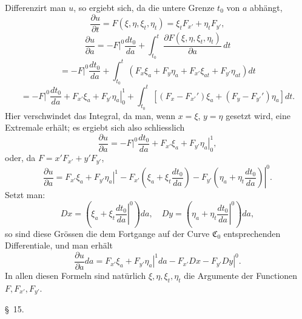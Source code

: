 \documentclass[11pt,a4paper,leqno]{article}
\begin{document}
Differenzirt man $u$, so ergiebt sich, da die untere Grenze $t_0$ von $a$ abhängt,
\[
\frac{\partial u}{\partial t}=F(\xi,\eta,\xi_t,\eta_t)=\xi_tF_{x'}+\eta_tF_{y'},
\]
\begin{equation}\tag{30}
\frac{\partial u}{\partial a}
=-\left.F\right|^0\frac{dt_0}{da}
+\int_{t_0}^{t}\frac{\partial F(\xi,\eta,\xi_t,\eta_t)}{\partial a}\,dt
\end{equation}
\[
=-\left.F\right|^0\frac{dt_0}{da}
+\int_{t_0}^{t}\left(F_x\xi_a+F_y\eta_a+F_{x'}\xi_{at}+F_{y'}\eta_{at}\right)dt
\]
\begin{equation}\tag{30}
=-\left.F\right|^0\frac{dt_0}{da}
+\left.F_{x'}\xi_a+F_{y'}\eta_a\right|_0^1
+\int_{t_0}^{t}\left[(F_x-F_{x'}')\xi_a+(F_y-F_{y'}')\eta_a\right]dt.
\end{equation}
Hier verschwindet das Integral, da man, wenn $x=\xi$, $y=\eta$ gesetzt wird, eine Extremale erhält; es ergiebt sich also schliesslich
\begin{equation}\tag{31}
\frac{\partial u}{\partial a}
=-\left.F\right|^0\frac{dt_0}{da}
+\left.F_{x'}\xi_a+F_{y'}\eta_a\right|_0^1,
\end{equation}
oder, da $F=x'F_{x'}+y'F_{y'}$,
\[
\frac{\partial u}{\partial a}
=\left.F_{x'}\xi_a+F_{y'}\eta_a\right|^1
-\left.F_{x'}\left(\xi_a+\xi_t\frac{dt_0}{da}\right)
-F_{y'}\left(\eta_a+\eta_t\frac{dt_0}{da}\right)\right|^0.
\]
Setzt man:
\[
Dx=\left(\xi_a+\xi_t\left.\frac{dt_0}{da}\right|^0\right)da,
\quad
Dy=\left(\eta_a+\eta_t\left.\frac{dt_0}{da}\right|^0\right)da,
\]
so sind diese Grössen die dem Fortgange auf der Curve $\mathfrak{C}_0$ entsprechenden Differentiale, und man erhält
\begin{equation}\tag{32}
\frac{\partial u}{\partial a}da=
\left.F_{x'}\xi_a+F_{y'}\eta_a\right|^1da
-\left.F_{x'}Dx-F_{y'}Dy\right|^0.
\end{equation}
In allen diesen Formeln sind natürlich $\xi,\eta,\xi_t,\eta_t$ die Argumente der Functionen $F,F_{x'},F_{y'}$.

\begin{center}{\large \S~15.}\end{center}
\end{document}
